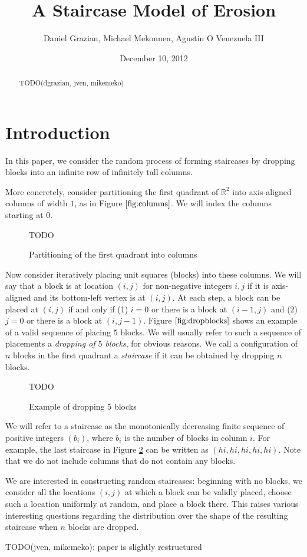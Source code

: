\documentclass[12pt]{amsart}
\title{A Staircase Model of Erosion}
\author{Daniel Grazian, Michael Mekonnen, Agustin O Venezuela III}
\date{December 10, 2012}
\newcommand{\R}{\mathbb{R}}
\newcommand{\newfigure}[3]{
\begin{figure}
#3
\caption{#2 \label{#1}}
\end{figure}
}
\newcommand{\newsection}[2]{
\section{#1 \label{#2}}
}
\begin{document}
\begin{abstract}
TODO(dgrazian, jven, mikemeko)
\end{abstract}

\maketitle

\newsection{Introduction}{sec:intro}
In this paper, we consider the random process of forming staircases by dropping blocks into an infinite row of infinitely tall columns.

More concretely, consider partitioning the first quadrant of $\R^2$ into axis-aligned columns of width $1$, as in Figure $\ref{fig:columns}$. We will index the columns starting at $0$.

\newfigure{fig:columns}{Partitioning of the first quadrant into columns}{
TODO
}

Now consider iteratively placing unit squares (blocks) into these columns. We will say that a block is at location $(i, j)$ for non-negative integers $i, j$ if it is axis-aligned and its bottom-left vertex is at $(i, j)$. At each step, a block can be placed at $(i, j)$ if and only if (1) $i = 0$ or there is a block at $(i - 1, j)$ and (2) $j = 0$ or there is a block at $(i, j - 1)$. Figure $\ref{fig:dropblocks}$ shows an example of a valid sequence of placing $5$ blocks. We will usually refer to such a sequence of placements a \textit{dropping of $5$ blocks}, for obvious reasons. We call a configuration of $n$ blocks in the first quadrant a \textit{staircase} if it can be obtained by dropping $n$ blocks.

\newfigure{fig:dropblocks}{Example of dropping $5$ blocks}{
TODO
}

We will refer to a staircase as the monotonically decreasing finite sequence of positive integers $(b_i)$, where $b_i$ is the number of blocks in column $i$. For example, the last staircase in Figure \ref{fig:dropblocks} can be written as $(hi,hi,hi,hi,hi)$. Note that we do not include columns that do not contain any blocks.

We are interested in constructing random staircases: beginning with no blocks, we consider all the locations $(i, j)$ at which a block can be validly placed, choose such a location uniformly at random, and place a block there. This raises various interesting questions regarding the distribution over the shape of the resulting staircase when $n$ blocks are dropped.

TODO(jven, mikemeko): paper is slightly restructured
\end{document}

